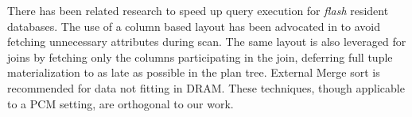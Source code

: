 \begin{comment}
Table \ref{tab:prev_work} summarises the previous work on PCM-conscious database operators algorithms.
\end{comment}
There has been related research to speed up query execution for \textit{flash} resident databases. The use of a column based layout has been advocated in \cite{graefe} to avoid fetching unnecessary attributes during scan. The same layout is also leveraged for joins by fetching only the columns participating in the join, deferring full tuple materialization to as late as possible in the plan tree. External Merge sort is recommended for data not fitting in DRAM. These techniques, though applicable to a PCM setting, are orthogonal to our work.